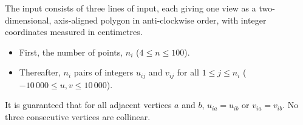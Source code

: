 

The input consists of three lines of input, each giving one view as a two-dimensional, axis-aligned
polygon in anti-clockwise order, with integer coordinates measured in centimetres.

\begin{itemize}
  \item First, the number of points, $n_i$ ($4 \le n \le 100$).
  \item Thereafter, $n_i$ pairs of integers $u_{ij}$ and $v_{ij}$ for all $1 \le j \le n_i$
        ($-10\,000 \le u,v \le 10\,000$).
\end{itemize}

It is guaranteed that for all adjacent vertices $a$ and $b$, $u_{ia} = u_{ib}$ or $v_{ia} = v_{ib}$.
No three consecutive vertices are collinear.

